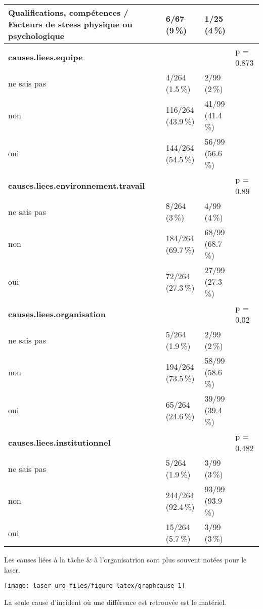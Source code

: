 \documentclass[a4paper,fontsize=10pt,french]{scrartcl}
\begin{document}
\begin{table}
\begin{tabularx}{\linewidth}[t]{X|l|l|l}
Qualifications, compétences / Facteurs de stress physique ou psychologique & 6/67 (9\,\%) & 1/25 (4\,\%) & \\
\midrule
\textbf{causes.liees.equipe} &  &  & p = 0.873\\
 
ne sais pas & 4/264 (1.5\,\%) & 2/99 (2\,\%) & \\
 
non & 116/264 (43.9\,\%) & 41/99 (41.4\,\%) & \\
 
oui & 144/264 (54.5\,\%) & 56/99 (56.6\,\%) & \\
\midrule
\textbf{causes.liees.environnement.travail} &  &  & p = 0.89\\
 
ne sais pas & 8/264 (3\,\%) & 4/99 (4\,\%) & \\
 
non & 184/264 (69.7\,\%) & 68/99 (68.7\,\%) & \\
 
oui & 72/264 (27.3\,\%) & 27/99 (27.3\,\%) & \\
\midrule
\textbf{causes.liees.organisation} &  &  & p = 0.02\\
 
ne sais pas & 5/264 (1.9\,\%) & 2/99 (2\,\%) & \\
 
non & 194/264 (73.5\,\%) & 58/99 (58.6\,\%) & \\
 
oui & 65/264 (24.6\,\%) & 39/99 (39.4\,\%) & \\
\midrule
\textbf{causes.liees.institutionnel} &  &  & p = 0.482\\
 
ne sais pas & 5/264 (1.9\,\%) & 3/99 (3\,\%) & \\
 
non & 244/264 (92.4\,\%) & 93/99 (93.9\,\%) & \\
 
oui & 15/264 (5.7\,\%) & 3/99 (3\,\%) & \\
  \bottomrule
\end{tabularx}
\end{table}

Les causes liées à la tâche \& à l'organisatrion sont plus souvent
notées pour le laser.

\texttt{[image: laser\_uro\_files/figure-latex/graphcause-1]}

La seule cause d'incident où une différence est retrouvée est le
matériel.
\end{document}
